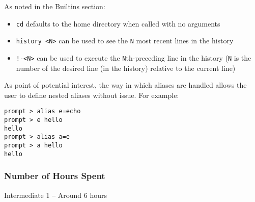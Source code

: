 \documentclass[]{article}
\providecommand{\tightlist}{%
  \setlength{\itemsep}{0pt}\setlength{\parskip}{0pt}}
\begin{document}
As noted in the Builtins section:

\begin{itemize}
\tightlist
\item
  \texttt{cd} defaults to the home directory when called with no
  arguments
\item
  \texttt{history\ \textless{}N\textgreater{}} can be used to see the
  \texttt{N} most recent lines in the history
\item
  \texttt{!-\textless{}N\textgreater{}} can be used to execute the
  \texttt{N}th-preceding line in the history (\texttt{N} is the number
  of the desired line (in the history) relative to the current line)
\end{itemize}

As point of potential interest, the way in which aliases are handled
allows the user to define nested aliases without issue. For example:

\begin{verbatim}
prompt > alias e=echo
prompt > e hello
hello 
prompt > alias a=e
prompt > a hello
hello 
\end{verbatim}

\subsubsection{Number of Hours Spent}\label{number-of-hours-spent}

Intermediate 1 -- Around 6 hours
\end{document}
